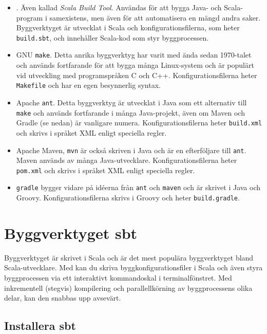 \begin{itemize}
\item \sbt. Även kallad \textit{Scala Build Tool}. Användas för att bygga Java- och Scala-program i samexistens, men även för att automatisera en mängd andra saker. Byggverktyget är utvecklat i Scala och konfigurationsfilerna, som heter \texttt{build.sbt}, och innehåller Scala-kod som styr byggprocessen. 

\item GNU \texttt{make}. Detta anrika byggverktyg har varit med ända sedan 1970-talet och används fortfarande för att bygga många Linux-system och är populärt vid utveckling med programspråken C och C++. Konfigurationsfilerna heter \texttt{Makefile} och har en egen besynnerlig syntax.

\item Apache \texttt{ant}. Detta byggverktyg är utvecklat i Java som ett alternativ till \texttt{make} och används fortfarande i många Java-projekt, även om Maven och Gradle (se nedan) är vanligare numera. Konfigurationsfilerna heter \texttt{build.xml} och skrivs i språket XML enligt  speciella regler.

\item Apache Maven, \texttt{mvn} är också skriven i Java och är en efterföljare till \texttt{ant}. Maven används av många Java-utvecklare. Konfigurationsfilerna heter \texttt{pom.xml} och skrivs i språket XML enligt  speciella regler.

\item \texttt{gradle} bygger vidare på idéerna från \texttt{ant} och \texttt{maven} och är skrivet i Java och Groovy.  Konfigurationsfilerna skrivs i Groovy och heter \texttt{build.gradle}.  

\end{itemize} 

\section{Byggverktyget sbt}

Byggverktyget \sbt är skrivet i Scala och är det mest populära byggverktyget bland Scala-utvecklare. Med \sbt kan du skriva byggkonfigurationsfiler i Scala och även styra byggprocessen via ett interaktivt kommandoskal i terminalfönstret. Med inkrementell (stegvis) kompilering och parallellkörning av byggprocessens olika delar, kan den snabbas upp avsevärt.    


\subsection{Installera sbt}


